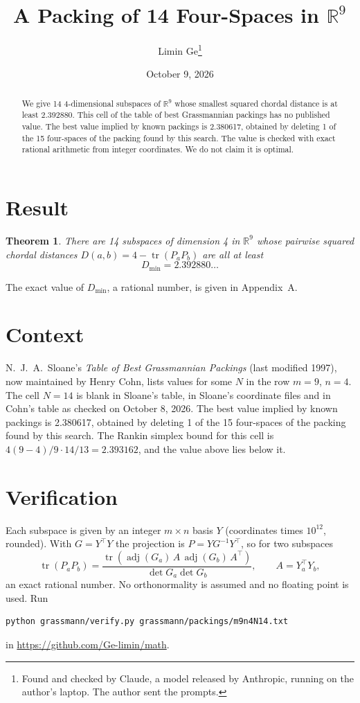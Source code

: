 \documentclass[11pt,a4paper]{article}
\title{A Packing of 14 Four-Spaces in $\mathbb{R}^{9}$}
\author{Limin Ge\thanks{Found and checked by Claude, a model released by Anthropic, running on the author's laptop. The author sent the prompts.}}
\date{October 9, 2026}
\newtheorem*{theorem}{Theorem}
\begin{document}
\maketitle
\begin{abstract}
We give 14 4-dimensional subspaces of $\mathbb{R}^{9}$ whose smallest squared chordal distance is at least 2.392880. This cell of the table of best Grassmannian packings has no published value. The best value implied by known packings is 2.380617, obtained by deleting 1 of the 15 four-spaces of the packing found by this search. The value is checked with exact rational arithmetic from integer coordinates. We do not claim it is optimal.
\end{abstract}

\section{Result}
\begin{theorem}
There are 14 subspaces of dimension 4 in $\mathbb{R}^{9}$ whose pairwise squared chordal distances $D(a,b) = 4 - \operatorname{tr}(P_aP_b)$ are all at least
\[ D_{\min} = 2.392880\ldots \]
\end{theorem}
The exact value of $D_{\min}$, a rational number, is given in Appendix~A.


\section{Context}
N.~J.~A.~Sloane's \emph{Table of Best Grassmannian Packings} (last modified 1997), now maintained by Henry Cohn, lists values for some $N$ in the row $m=9$, $n=4$. The cell $N=14$ is blank in Sloane's table, in Sloane's coordinate files and in Cohn's table as checked on October 8, 2026. The best value implied by known packings is 2.380617, obtained by deleting 1 of the 15 four-spaces of the packing found by this search. The Rankin simplex bound for this cell is $4(9-4)/9\cdot 14/13 = 2.393162$, and the value above lies below it.


\section{Verification}
Each subspace is given by an integer $m\times n$ basis $Y$ (coordinates times $10^{12}$, rounded). With $G=Y^\top Y$ the projection is $P=YG^{-1}Y^\top$, so for two subspaces
\[ \operatorname{tr}(P_aP_b)=\frac{\operatorname{tr}(\operatorname{adj}(G_a)\,A\,\operatorname{adj}(G_b)\,A^\top)}{\det G_a\det G_b},\qquad A=Y_a^\top Y_b, \]
an exact rational number. No orthonormality is assumed and no floating point is used. Run
\begin{verbatim}
python grassmann/verify.py grassmann/packings/m9n4N14.txt
\end{verbatim}
in \url{https://github.com/Ge-limin/math}.
\end{document}

